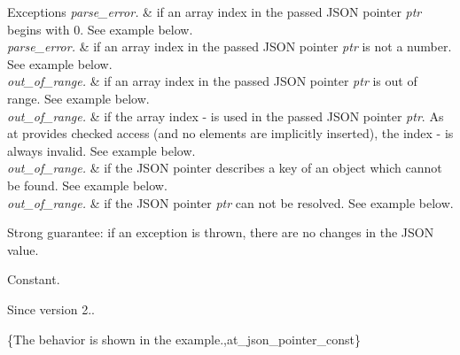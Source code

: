 \begin{DoxyExceptions}{Exceptions}
{\em parse\+\_\+error.} & if an array index in the passed J\+S\+ON pointer {\itshape ptr} begins with \textquotesingle{}0\textquotesingle{}. See example below.\\
\hline
{\em parse\+\_\+error.} & if an array index in the passed J\+S\+ON pointer {\itshape ptr} is not a number. See example below.\\
\hline
{\em out\+\_\+of\+\_\+range.} & if an array index in the passed J\+S\+ON pointer {\itshape ptr} is out of range. See example below.\\
\hline
{\em out\+\_\+of\+\_\+range.} & if the array index \textquotesingle{}-\/\textquotesingle{} is used in the passed J\+S\+ON pointer {\itshape ptr}. As {\ttfamily at} provides checked access (and no elements are implicitly inserted), the index \textquotesingle{}-\/\textquotesingle{} is always invalid. See example below.\\
\hline
{\em out\+\_\+of\+\_\+range.} & if the J\+S\+ON pointer describes a key of an object which cannot be found. See example below.\\
\hline
{\em out\+\_\+of\+\_\+range.} & if the J\+S\+ON pointer {\itshape ptr} can not be resolved. See example below.\\
\hline
\end{DoxyExceptions}
Strong guarantee\+: if an exception is thrown, there are no changes in the J\+S\+ON value.

Constant.

\begin{DoxySince}{Since}
version 2..
\end{DoxySince}
\{The behavior is shown in the example.,at\+\_\+json\+\_\+pointer\+\_\+const\} 
